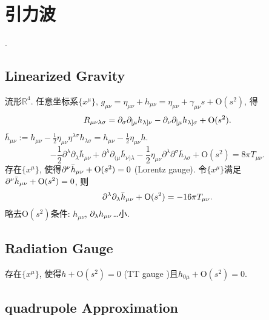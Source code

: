 \chapter{引力波}

\cite{Wald1984}.

\section{Linearized Gravity}

流形$\mathbb{R}^{4}$. 任意坐标系$\{x^{\mu}\}$, $g_{\mu\nu}=\eta_{\mu\nu}+h_{\mu\nu}=\eta_{\mu\nu}+\gamma_{\mu\nu}s+\text{O}(s^2)$, 得
\begin{equation}
    R_{\mu\nu\lambda\sigma}=\partial_\sigma\partial_{[\mu}h_{\lambda]\nu}-\partial_\nu\partial_{[\mu}h_{\lambda]\sigma}+\text{O}(s^2).
\end{equation}
$\bar{h}_{\mu\nu}:=h_{\mu\nu}-\frac{1}{2}\eta_{\mu\nu}\eta^{\lambda\sigma}h_{\lambda\sigma}=h_{\mu\nu}-\frac{1}{2}\eta_{\mu\nu}h$.
\begin{equation}
    -\frac{1}{2} \partial^{\lambda} \partial_{\lambda} \bar{h}_{\mu \nu}+\partial^{\lambda} \partial_{(\mu} \bar{h}_{\nu) \lambda}-\frac{1}{2} \eta_{\mu \nu} \partial^{\lambda} \partial^{\sigma} \bar{h}_{\lambda \sigma}+\text{O}(s^2)=8 \pi T_{\mu \nu}.
\end{equation}
存在$\{x^{\mu}\}$, 使得$\partial^{\nu}\bar{h}_{\mu\nu}+\text{O}(s^2)=0$ (Lorentz gauge). 
令$\{x^{\mu}\}$满足$\partial^{\nu}\bar{h}_{\mu\nu}+\text{O}(s^2)=0$, 则
\begin{equation}
    \partial^{\lambda}\partial_{\lambda}\bar{h}_{\mu\nu}+\text{O}(s^2)=-16\pi T_{\mu \nu}.\label{linear_gravity}
\end{equation}
略去$\text{O}(s^2)$条件: $h_{\mu\nu}$, $\partial_\lambda h_{\mu\nu}$\dots{}小.

\section{Radiation Gauge}

存在$\{x^{\mu}\}$, 使得$h+\text{O}(s^2)=0$ (TT gauge \cite{Wang2020})且$h_{0\mu}+\text{O}(s^2)=0$. 

\section{quadrupole Approximation}

